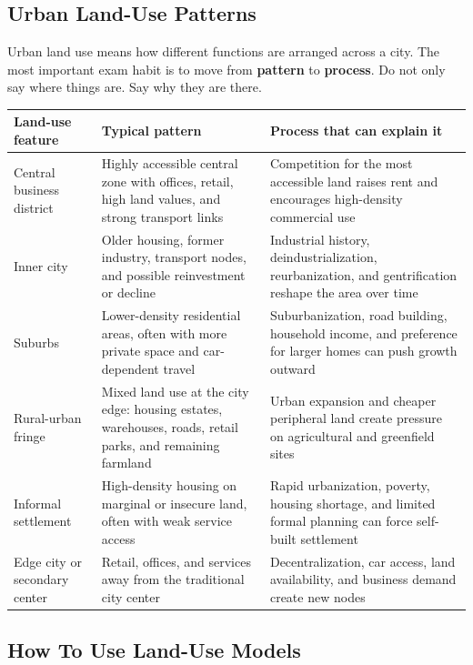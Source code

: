 \documentclass[11pt,a4paper]{article}
\newcommand{\term}[1]{\textcolor{HeadingBlue}{\textbf{#1}}}
\begin{document}
\subsection{Urban Land-Use Patterns}

Urban land use means how different functions are arranged across a city. The
most important exam habit is to move from \term{pattern} to \term{process}.
Do not only say where things are. Say why they are there.

\begin{tabularx}{\textwidth}{L{0.23\textwidth}Y Y}
\toprule
\textbf{Land-use feature} & \textbf{Typical pattern} & \textbf{Process that can explain it} \\
\midrule
Central business district & Highly accessible central zone with offices,
retail, high land values, and strong transport links & Competition for the most
accessible land raises rent and encourages high-density commercial use \\
Inner city & Older housing, former industry, transport nodes, and possible
reinvestment or decline & Industrial history, deindustrialization,
reurbanization, and gentrification reshape the area over time \\
Suburbs & Lower-density residential areas, often with more private space and
car-dependent travel & Suburbanization, road building, household income, and
preference for larger homes can push growth outward \\
Rural-urban fringe & Mixed land use at the city edge: housing estates,
warehouses, roads, retail parks, and remaining farmland & Urban expansion and
cheaper peripheral land create pressure on agricultural and greenfield sites \\
Informal settlement & High-density housing on marginal or insecure land, often
with weak service access & Rapid urbanization, poverty, housing shortage, and
limited formal planning can force self-built settlement \\
Edge city or secondary center & Retail, offices, and services away from the
traditional city center & Decentralization, car access, land availability, and
business demand create new nodes \\
\bottomrule
\end{tabularx}

\subsection{How To Use Land-Use Models}
\end{document}
